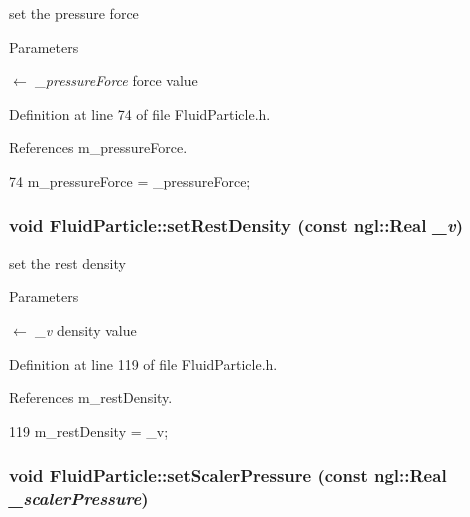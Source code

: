 set the pressure force 


\begin{DoxyParams}{Parameters}
\item[\mbox{$\leftarrow$} {\em \_\-pressureForce}]force value \end{DoxyParams}


Definition at line 74 of file FluidParticle.h.



References m\_\-pressureForce.




\begin{DoxyCode}
74 { m_pressureForce = _pressureForce; }
\end{DoxyCode}


\hypertarget{class_fluid_particle_a85333cc69cb0731330186c6a88c2ac37}{
\subsubsection[{setRestDensity}]{\setlength{\rightskip}{0pt plus 5cm}void FluidParticle::setRestDensity (const ngl::Real {\em \_\-v})}}
\label{class_fluid_particle_a85333cc69cb0731330186c6a88c2ac37}


set the rest density 


\begin{DoxyParams}{Parameters}
\item[\mbox{$\leftarrow$} {\em \_\-v}]density value \end{DoxyParams}


Definition at line 119 of file FluidParticle.h.



References m\_\-restDensity.




\begin{DoxyCode}
119 { m_restDensity = _v; }
\end{DoxyCode}


\hypertarget{class_fluid_particle_abfd00e4a0fb0adcad1b320c3ddcdf257}{
\subsubsection[{setScalerPressure}]{\setlength{\rightskip}{0pt plus 5cm}void FluidParticle::setScalerPressure (const ngl::Real {\em \_\-scalerPressure})}}
\label{class_fluid_particle_abfd00e4a0fb0adcad1b320c3ddcdf257}


